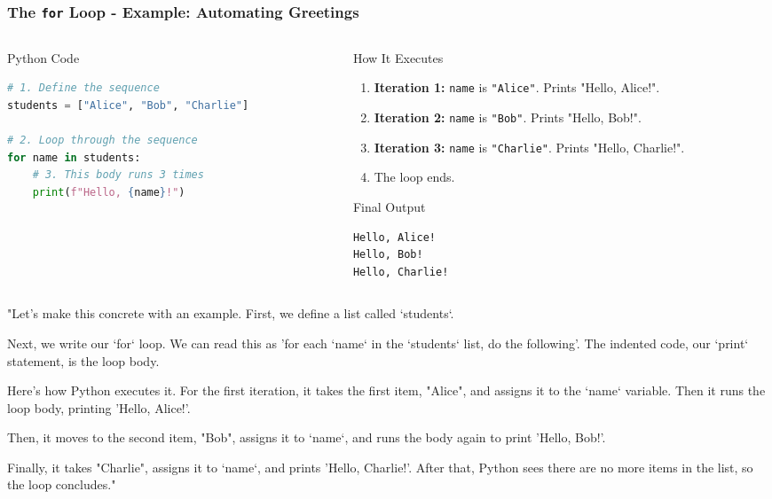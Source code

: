 \documentclass{beamer}
\begin{document}
\begin{frame}[fragile]
    \frametitle{The \texttt{for} Loop - Example: Automating Greetings}
    
    \begin{columns}[T]
        \begin{column}{0.5\textwidth}
            \begin{block}{Python Code}
\begin{lstlisting}[language=Python]
# 1. Define the sequence
students = ["Alice", "Bob", "Charlie"]

# 2. Loop through the sequence
for name in students:
    # 3. This body runs 3 times
    print(f"Hello, {name}!")
\end{lstlisting}
            \end{block}
        \end{column}
        \begin{column}{0.5\textwidth}
            \begin{block}{How It Executes}
                \begin{enumerate}
                    \item \textbf{Iteration 1:} \texttt{name} is \texttt{"Alice"}. Prints "Hello, Alice!".
                    \item \textbf{Iteration 2:} \texttt{name} is \texttt{"Bob"}. Prints "Hello, Bob!".
                    \item \textbf{Iteration 3:} \texttt{name} is \texttt{"Charlie"}. Prints "Hello, Charlie!".
                    \item The loop ends.
                \end{enumerate}
            \end{block}
            \begin{block}{Final Output}
\begin{verbatim}
Hello, Alice!
Hello, Bob!
Hello, Charlie!
\end{verbatim}
            \end{block}
        \end{column}
    \end{columns}
    
    \begin{note}
    "Let's make this concrete with an example. First, we define a list called `students`.

    Next, we write our `for` loop. We can read this as 'for each `name` in the `students` list, do the following'. The indented code, our `print` statement, is the loop body.

    Here's how Python executes it. For the first iteration, it takes the first item, "Alice", and assigns it to the `name` variable. Then it runs the loop body, printing 'Hello, Alice!'.
    
    Then, it moves to the second item, "Bob", assigns it to `name`, and runs the body again to print 'Hello, Bob!'.
    
    Finally, it takes "Charlie", assigns it to `name`, and prints 'Hello, Charlie!'. After that, Python sees there are no more items in the list, so the loop concludes."
    \end{note}
\end{frame}
\end{document}
